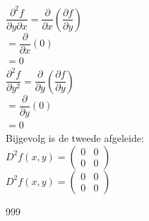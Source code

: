 \documentclass[a4paper]{article}
\begin{document}
$\dfrac{\partial^2 f}{\partial y\partial x}
=
\dfrac{\partial}{\partial x}
\left(
\dfrac{\partial f}{\partial y}
\right)$\\

$=
\dfrac{\partial}{\partial x}(0)$\\

$=
0$\\

$\dfrac{\partial^2 f}{\partial y^2}
=
\dfrac{\partial}{\partial y}
\left(
\dfrac{\partial f}{\partial y}
\right)$\\

$=
\dfrac{\partial}{\partial y}(0)$\\

$=
0$\\

Bijgevolg is de tweede afgeleide:\\

$D^2f(x,y)
=
\left(
\begin{array}{cc}
0 & 0\\
0 & 0
\end{array}
\right)$\\

$\boxed{
D^2f(x,y)
=
\left(
\begin{array}{cc}
0 & 0\\
0 & 0
\end{array}
\right)
}$\\

\begin{thebibliography}{999}
\end{thebibliography}
\end{document}
